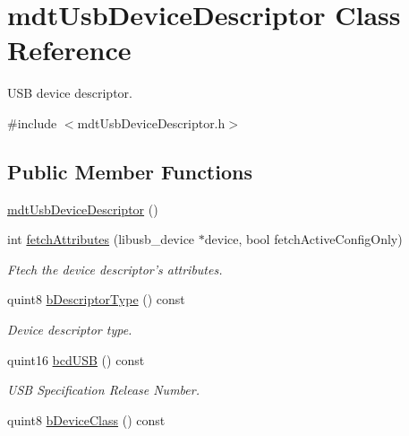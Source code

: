 \hypertarget{classmdt_usb_device_descriptor}{
\section{mdtUsbDeviceDescriptor Class Reference}
\label{classmdt_usb_device_descriptor}
}


USB device descriptor.  




{\ttfamily \#include $<$mdtUsbDeviceDescriptor.h$>$}

\subsection*{Public Member Functions}
\begin{DoxyCompactItemize}
\item 
\hyperlink{classmdt_usb_device_descriptor_a56261ab887b96741e5d444e92ed80b35}{mdtUsbDeviceDescriptor} ()
\item 
int \hyperlink{classmdt_usb_device_descriptor_a6239e5e56e2e25a686cac98b18158500}{fetchAttributes} (libusb\_\-device $\ast$device, bool fetchActiveConfigOnly)
\begin{DoxyCompactList}\small\item\em Ftech the device descriptor's attributes. \end{DoxyCompactList}\item 
\hypertarget{classmdt_usb_device_descriptor_add8de4e1850995461a37ed27b75b4381}{
quint8 \hyperlink{classmdt_usb_device_descriptor_add8de4e1850995461a37ed27b75b4381}{bDescriptorType} () const }
\label{classmdt_usb_device_descriptor_add8de4e1850995461a37ed27b75b4381}

\begin{DoxyCompactList}\small\item\em Device descriptor type. \end{DoxyCompactList}\item 
quint16 \hyperlink{classmdt_usb_device_descriptor_ae5f4d1cabe204ca0aa00735d04516e86}{bcdUSB} () const 
\begin{DoxyCompactList}\small\item\em USB Specification Release Number. \end{DoxyCompactList}\item 
\hypertarget{classmdt_usb_device_descriptor_a94e04915c8df9102db54068911b92532}{
quint8 \hyperlink{classmdt_usb_device_descriptor_a94e04915c8df9102db54068911b92532}{bDeviceClass} () const }
\label{classmdt_usb_device_descriptor_a94e04915c8df9102db54068911b92532}


\end{DoxyCompactItemize}
